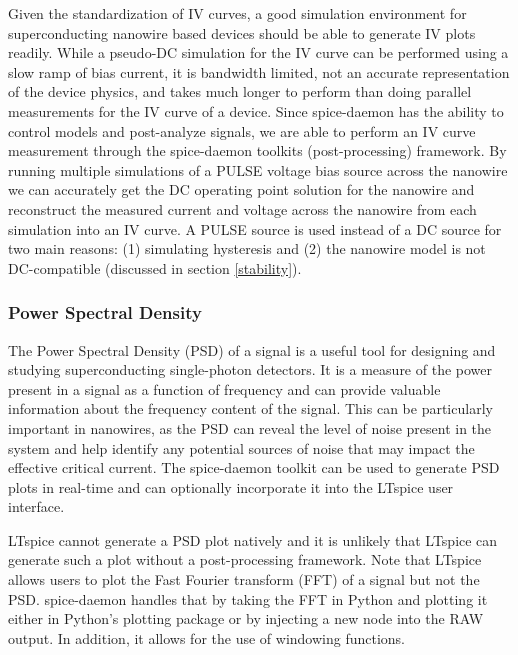 Given the standardization of IV curves, a good simulation environment for superconducting nanowire based devices
should be able to generate IV plots readily. While a pseudo-DC simulation for the IV curve can be performed
using a slow ramp of bias current, it is bandwidth limited, not an accurate representation of the device physics, 
and takes much longer to perform than doing parallel measurements for the IV curve of a device. Since spice-daemon
has the ability to control models and post-analyze signals, we are able to perform an IV curve measurement through
the spice-daemon toolkits (post-processing) framework. By running multiple simulations of a PULSE voltage bias source across the nanowire
we can accurately get the DC operating point solution for the nanowire and reconstruct the measured current and voltage
across the nanowire from each simulation into an IV curve. A PULSE source is used instead of a DC 
source for two main reasons: (1) 
simulating hysteresis and (2) the nanowire model is not DC-compatible (discussed in section \ref{stability}).


\subsubsection{Power Spectral Density}

The Power Spectral Density (PSD) of a signal is a useful tool for designing and studying
superconducting single-photon detectors. It is a 
measure of the power present in a signal as a function of frequency and can provide valuable information about 
the frequency content of the signal. This can be particularly important in nanowires, 
as the PSD can reveal the level of noise present in the system and help identify any 
potential sources of noise that may impact the effective critical current. 
The spice-daemon toolkit can be used to generate PSD plots in real-time and can 
optionally incorporate it into the LTspice user interface.

LTspice cannot generate a PSD plot natively and it is unlikely that LTspice
 can generate such a plot without a post-processing framework.
Note that LTspice allows users to plot the Fast Fourier transform (FFT) of a signal but not the 
PSD. spice-daemon handles that by taking the FFT in Python and plotting it either in Python's 
plotting package  or by injecting a new node into the RAW output. In addition,
it allows for the use of windowing functions.

